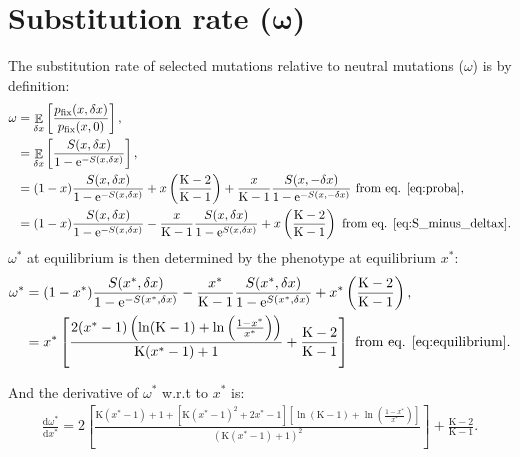 \documentclass{article}
\DeclareMathOperator{\E}{\mathbb{E}}
\newcommand{\der}{\mathrm{d}}
\newcommand{\e}{\mathrm{e}}
\newcommand{\dnds}{\omega}
\newcommand{\Nstate}{\text{K}}
\newcommand{\x}{x}
\newcommand{\eq}{^{*}}
\newcommand{\dx}{\delta \x}
\begin{document}
\section*{Substitution rate ($\bm{\dnds}$)}
The substitution rate of selected mutations relative to neutral mutations  ($\dnds$) is by definition:
\begin{align}
\dnds & = \E_{\dx} \left[ \frac{p_{\text{fix}}(\x, \dx)}{p_{\text{fix}}(\x, 0)} \right], \\
 & = \E_{\dx} \left[ \frac{ S(\x, \dx)}{1 - \e^{-S(\x, \dx)}} \right], \\
 & = (1 - \x) \frac{ S(\x, \dx)}{1 - \e^{-S(\x, \dx)}} + \x \left(\frac{\Nstate - 2}{\Nstate - 1}\right) + \frac{\x}{\Nstate-1} \frac{ S(\x, -\dx)}{1 - \e^{-S(\x, -\dx)}} \text{ from eq. \ref{eq:proba}}, \\
 & = (1 - \x) \frac{ S(\x, \dx)}{1 - \e^{-S(\x, \dx)}} - \frac{\x}{\Nstate-1}  \frac{ S(\x, \dx)}{1 - \e^{S(\x, \dx)}} +  \x \left(\frac{\Nstate - 2}{\Nstate - 1}\right) \text{ from eq. \ref{eq:S_minus_deltax}}.
\end{align}
$\dnds\eq$ at equilibrium is then determined by the phenotype at equilibrium $\x\eq$:
\begin{align}
\dnds\eq &= (1 - \x\eq) \frac{ S(\x\eq, \dx)}{1 - \e^{-S(\x\eq, \dx)}} - \frac{\x\eq}{\Nstate-1} \frac{ S(\x\eq, \dx)}{1 - \e^{S(\x\eq, \dx)}} + \x\eq \left(\frac{\Nstate - 2}{\Nstate - 1}\right) , \\
 &= \x\eq \left[ \frac{2 (\x\eq-1)  \left(\ln (\Nstate-1)+\ln \left(\frac{1 -\x\eq}{\x\eq}\right)\right)}{\Nstate (\x\eq-1)+1} + \frac{\Nstate - 2}{\Nstate - 1}\right] \text{ from eq. \ref{eq:equilibrium}}.
\end{align}
\begin{center}
\end{center}
And the derivative of $\dnds\eq$ w.r.t to $\x\eq$ is: 
\begin{gather}
\frac{\der \dnds\eq}{\der \x\eq} = 2 \left[ \frac{\Nstate (\x\eq- 1) + 1+\left[\Nstate (\x\eq-1)^2+2 \x\eq-1\right] \left[ \ln (\Nstate-1) + \ln \left(\frac{1 - \x\eq}{\x\eq} \right) \right]}{(\Nstate (\x\eq-1)+1)^2}\right] + \frac{\Nstate - 2}{\Nstate - 1} \label{eq:dw_dx}.
\end{gather}
\end{document}
